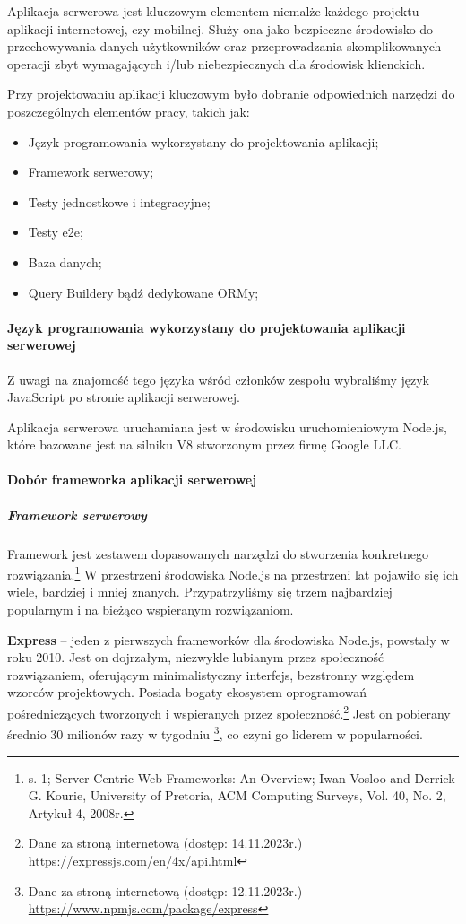 \documentclass[12pt, a4paper, twoside, openany]{book}
\begin{document}
Aplikacja serwerowa jest kluczowym elementem niemalże każdego projektu aplikacji
internetowej, czy mobilnej. Służy ona jako bezpieczne środowisko do przechowywania danych
użytkowników oraz przeprowadzania skomplikowanych operacji zbyt wymagających i/lub
niebezpiecznych dla środowisk klienckich.

Przy projektowaniu aplikacji kluczowym było dobranie odpowiednich narzędzi do
poszczególnych elementów pracy, takich jak:
\begin{itemize}
    \item Język programowania wykorzystany do projektowania aplikacji;
    \item Framework serwerowy;
    \item Testy jednostkowe i integracyjne;
    \item Testy e2e;
    \item Baza danych;
    \item Query Buildery bądź dedykowane ORMy; %
\end{itemize}

\paragraph{Język programowania wykorzystany do projektowania aplikacji serwerowej\\}

Z uwagi na znajomość tego języka wśród członków zespołu wybraliśmy język JavaScript
po stronie aplikacji serwerowej.

Aplikacja serwerowa uruchamiana jest w środowisku uruchomieniowym Node.js, które bazowane jest na
silniku V8 stworzonym przez firmę Google LLC.

\paragraph{Dobór frameworka aplikacji serwerowej}
\subparagraph{Framework serwerowy\\}

Framework jest zestawem dopasowanych narzędzi do stworzenia konkretnego rozwiązania.\footnote{s. 1; Server-Centric Web Frameworks: An Overview; Iwan Vosloo and Derrick G. Kourie, University of Pretoria, ACM Computing Surveys, Vol. 40, No. 2, Artykuł 4, 2008r.}
W przestrzeni środowiska Node.js na przestrzeni lat pojawiło się ich wiele, bardziej i
mniej znanych. Przypatrzyliśmy się trzem najbardziej popularnym i na bieżąco wspieranym
rozwiązaniom.

\textbf{Express} -- jeden z pierwszych frameworków dla środowiska Node.js, powstały w roku 2010.
Jest on dojrzałym, niezwykle lubianym przez społeczność rozwiązaniem, oferującym
minimalistyczny interfejs, bezstronny względem wzorców projektowych. Posiada bogaty ekosystem
oprogramowań pośredniczących tworzonych i wspieranych przez społeczność.\footnote{Dane za stroną internetową (dostęp: 14.11.2023r.) \url{https://expressjs.com/en/4x/api.html}}
Jest on pobierany średnio 30 milionów razy w tygodniu \footnote{Dane za stroną internetową (dostęp: 12.11.2023r.) \url{https://www.npmjs.com/package/express}}, co czyni go liderem w popularności.
\end{document}
